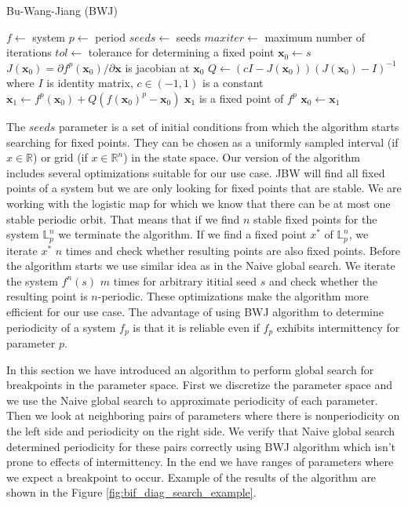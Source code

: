 \begin{algorithm}[!h]
    \caption{Bu-Wang-Jiang (BWJ)}
    \label{alg:bwj}
    \begin{algorithmic}[1]
        \State $f \gets$ system
        \State $p \gets$ period
        \State $seeds \gets$ seeds
        \State $maxiter \gets$ maximum number of iterations
        \State $tol \gets$ tolerance for determining a fixed point
            \State $\textbf{x}_{0} \gets s$
                \State $J(\textbf{x}_{0}) = \partial f^{p}(\textbf{x}_{0}) / \partial \textbf{x}$ is jacobian at $\textbf{x}_{0}$
                \State $Q \gets (cI-J(\textbf{x}_{0}))(J(\textbf{x}_{0})-I)^{-1}$ where $I$ is identity matrix, $c \in (-1, 1)$ is a constant 
                \State $\textbf{x}_1 \gets f^{p}(\textbf{x}_{0}) + Q(f(\textbf{x}_{0})^{p}-\textbf{x}_{0})$
                    \State $\textbf{x}_{1}$ is a fixed point of $f^{p}$
                \EndIf
                \State $\textbf{x}_{0} \gets \textbf{x}_{1}$
            \EndWhile
        \EndFor
    \end{algorithmic}
\end{algorithm}

The $seeds$ parameter is a set of initial conditions from which the algorithm starts searching for fixed points.
They can be chosen as a uniformly sampled interval (if $x \in \mathbb{R}$) or grid (if $x \in \mathbb{R}^{n}$) in the state space.
Our version of the algorithm includes several optimizations suitable for our use case.
JBW will find all fixed points of a system but we are only looking for fixed points that are stable.
We are working with the logistic map for which we know that there can be at most one stable periodic orbit.
That means that if we find $n$ stable fixed points for the system $\mathbb{L}_{p}^{n}$ we terminate the algorithm.
If we find a fixed point $x^{*}$ of $\mathbb{L}_{p}^{n}$, we iterate $x^{*}$ $n$ times and check whether resulting points are also fixed points.
Before the algorithm starts we use similar idea as in the Naive global search. We iterate the system $f^{n}(s)$ $m$ times for arbitrary ititial seed $s$ and check whether the resulting point is $n$-periodic.
These optimizations make the algorithm more efficient for our use case.
The advantage of using BWJ algorithm to determine periodicity of a system $f_{p}$ is that it is reliable even if $f_{p}$ exhibits intermittency for parameter $p$.
\par
In this section we have introduced an algorithm to perform global search for breakpoints in the parameter space.
First we discretize the parameter space and we use the Naive global search to approximate periodicity of each parameter.
Then we look at neighboring pairs of parameters where there is nonperiodicity on the left side and periodicity on the right side.
We verify that Naive global search determined periodicity for these pairs correctly using BWJ algorithm which isn't prone to effects of intermittency.
In the end we have ranges of parameters where we expect a breakpoint to occur.
Example of the results of the algorithm are shown in the Figure \ref{fig:bif_diag_search_example}.

